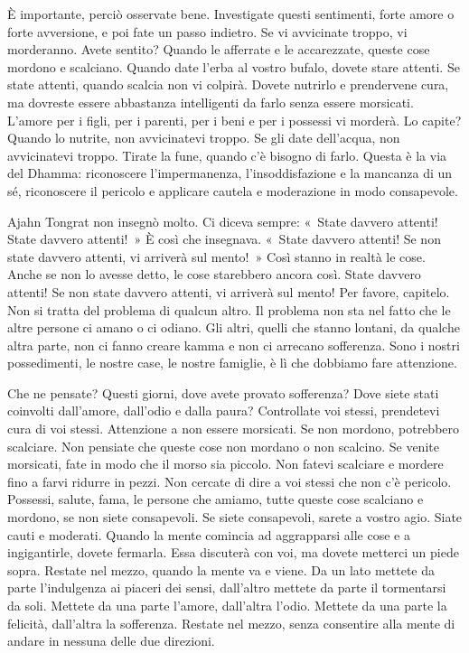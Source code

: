 È importante, perciò osservate bene. Investigate questi sentimenti,
forte amore o forte avversione, e poi fate un passo indietro. Se vi
avvicinate troppo, vi morderanno. Avete sentito? Quando le afferrate e
le accarezzate, queste cose mordono e scalciano. Quando date l'erba al
vostro bufalo, dovete stare attenti. Se state attenti, quando scalcia
non vi colpirà. Dovete nutrirlo e prendervene cura, ma dovreste essere
abbastanza intelligenti da farlo senza essere morsicati. L'amore per i
figli, per i parenti, per i beni e per i possessi vi morderà. Lo capite?
Quando lo nutrite, non avvicinatevi troppo. Se gli date dell'acqua, non
avvicinatevi troppo. Tirate la fune, quando c'è bisogno di farlo. Questa
è la via del Dhamma: riconoscere l'impermanenza, l'insoddisfazione e la
mancanza di un sé, riconoscere il pericolo e applicare cautela e
moderazione in modo consapevole.

Ajahn Tongrat non insegnò molto. Ci diceva sempre: «~State davvero
attenti! State davvero attenti!~» È così che insegnava. «~State davvero
attenti! Se non state davvero attenti, vi arriverà sul mento!~» Così
stanno in realtà le cose. Anche se non lo avesse detto, le cose
starebbero ancora così. State davvero attenti! Se non state davvero
attenti, vi arriverà sul mento! Per favore, capitelo. Non si tratta del
problema di qualcun altro. Il problema non sta nel fatto che le altre
persone ci amano o ci odiano. Gli altri, quelli che stanno lontani, da
qualche altra parte, non ci fanno creare kamma e non ci arrecano
sofferenza. Sono i nostri possedimenti, le nostre case, le nostre
famiglie, è lì che dobbiamo fare attenzione.

Che ne pensate? Questi giorni, dove avete provato sofferenza? Dove siete
stati coinvolti dall'amore, dall'odio e dalla paura? Controllate voi
stessi, prendetevi cura di voi stessi. Attenzione a non essere
morsicati. Se non mordono, potrebbero scalciare. Non pensiate che queste
cose non mordano o non scalcino. Se venite morsicati, fate in modo che
il morso sia piccolo. Non fatevi scalciare e mordere fino a farvi
ridurre in pezzi. Non cercate di dire a voi stessi che non c'è pericolo.
Possessi, salute, fama, le persone che amiamo, tutte queste cose
scalciano e mordono, se non siete consapevoli. Se siete consapevoli,
sarete a vostro agio. Siate cauti e moderati. Quando la mente comincia
ad aggrapparsi alle cose e a ingigantirle, dovete fermarla. Essa
discuterà con voi, ma dovete metterci un piede sopra. Restate nel mezzo,
quando la mente va e viene. Da un lato mettete da parte l'indulgenza ai
piaceri dei sensi, dall'altro mettete da parte il tormentarsi da soli.
Mettete da una parte l'amore, dall'altra l'odio. Mettete da una parte la
felicità, dall'altra la sofferenza. Restate nel mezzo, senza consentire
alla mente di andare in nessuna delle due direzioni.

